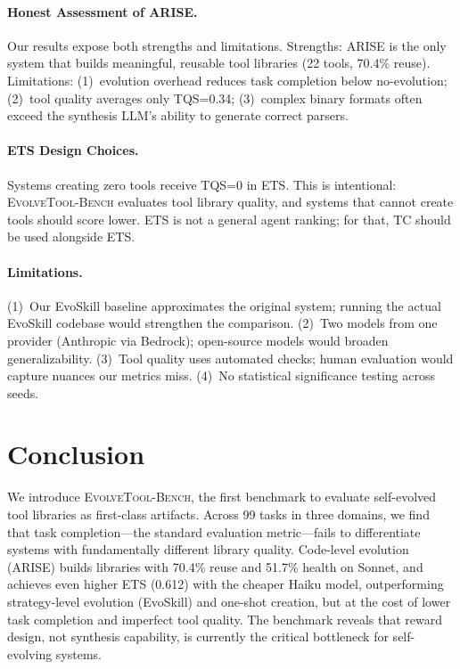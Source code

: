 \documentclass[]{ceurart}
\begin{document}
\paragraph{Honest Assessment of ARISE.} Our results expose both strengths and limitations. Strengths: ARISE is the only system that builds meaningful, reusable tool libraries (22 tools, 70.4\% reuse). Limitations: (1)~evolution overhead reduces task completion below no-evolution; (2)~tool quality averages only TQS=0.34; (3)~complex binary formats often exceed the synthesis LLM's ability to generate correct parsers.

\paragraph{ETS Design Choices.} Systems creating zero tools receive TQS=0 in ETS. This is intentional: \textsc{EvolveTool-Bench} evaluates tool library quality, and systems that cannot create tools should score lower. ETS is not a general agent ranking; for that, TC should be used alongside ETS.

\paragraph{Limitations.} (1)~Our EvoSkill baseline approximates the original system; running the actual EvoSkill codebase would strengthen the comparison. (2)~Two models from one provider (Anthropic via Bedrock); open-source models would broaden generalizability. (3)~Tool quality uses automated checks; human evaluation would capture nuances our metrics miss. (4)~No statistical significance testing across seeds.

\section{Conclusion}

We introduce \textsc{EvolveTool-Bench}, the first benchmark to evaluate self-evolved tool libraries as first-class artifacts. Across 99 tasks in three domains, we find that task completion---the standard evaluation metric---fails to differentiate systems with fundamentally different library quality. Code-level evolution (ARISE) builds libraries with 70.4\% reuse and 51.7\% health on Sonnet, and achieves even higher ETS (0.612) with the cheaper Haiku model, outperforming strategy-level evolution (EvoSkill) and one-shot creation, but at the cost of lower task completion and imperfect tool quality. The benchmark reveals that reward design, not synthesis capability, is currently the critical bottleneck for self-evolving systems.
\end{document}
